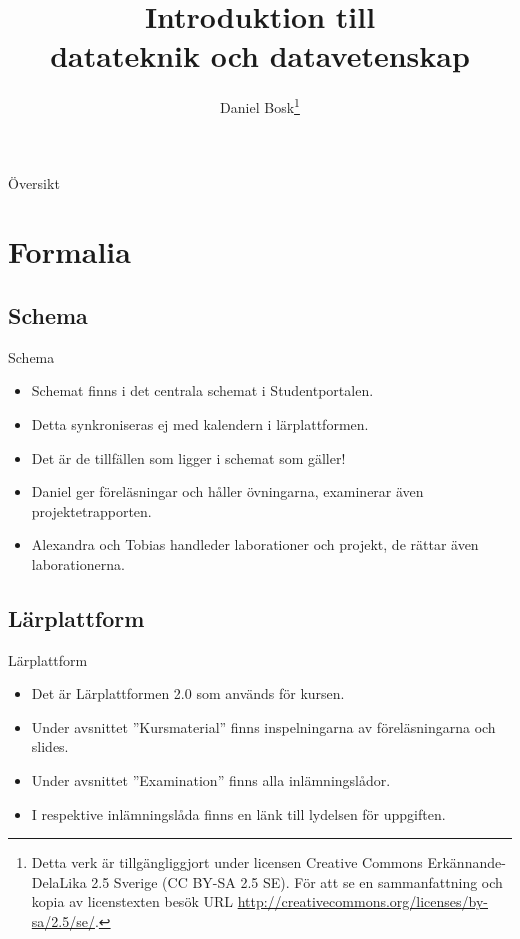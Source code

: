 \documentclass{beamer}
\title[Introduktion]{%
  Introduktion till \\
  datateknik och datavetenskap
}
\author{Daniel Bosk\footnote{%
	\tiny
	Detta verk är tillgängliggjort under licensen Creative Commons 
	Erkännande-DelaLika 2.5 Sverige (CC BY-SA 2.5 SE).
	För att se en sammanfattning och kopia av licenstexten besök URL 
	\url{http://creativecommons.org/licenses/by-sa/2.5/se/}.
}}
\institute[MIUN ITM]{%
  Avdelningen för informations- och kommunikationssytem (IKS),\\
  Mittuniversitetet, Sundsvall.
}
\date{\svnId}
\begin{document}
\begin{frame}
  \titlepage
\end{frame}

\begin{frame}{Översikt}
	\tableofcontents
\end{frame}





\section{Formalia}

\subsection{Schema}
\begin{frame}{Schema}
  \begin{itemize}
    \item Schemat finns i det centrala schemat i Studentportalen.
    \item Detta synkroniseras ej med kalendern i lärplattformen.
    \item Det är de tillfällen som ligger i schemat som gäller!
  \end{itemize}
  \begin{itemize}
    \item Daniel ger föreläsningar och håller övningarna, examinerar även 
      projektetrapporten.
    \item Alexandra och Tobias handleder laborationer och projekt, de rättar 
      även laborationerna.
  \end{itemize}
\end{frame}

\subsection{Lärplattform}
\begin{frame}{Lärplattform}
  \begin{itemize}
    \item Det är Lärplattformen 2.0 som används för kursen.
    \item Under avsnittet ''Kursmaterial'' finns inspelningarna av 
      föreläsningarna och slides.
    \item Under avsnittet ''Examination'' finns alla inlämningslådor.
    \item I respektive inlämningslåda finns en länk till lydelsen för 
      uppgiften.
  \end{itemize}
\end{frame}
\end{document}
